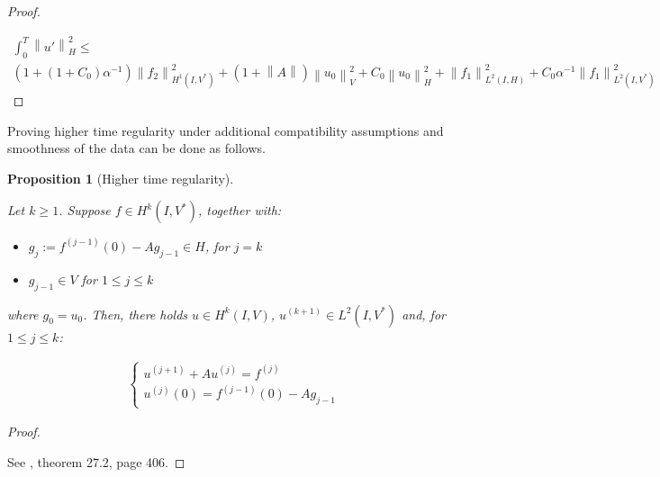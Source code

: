 \documentclass[english,a4paper,10pt,oneside]{scrbook}	%
\theoremstyle{break}
\newtheorem{prop}[equation]{Proposition}
\newenvironment{mproof}[1][\proofname]{%
  \begin{proof}[#1]$ $\par\nobreak\ignorespaces
}{%
  \end{proof}
}
\renewcommand*{\proofname}{Proof}
\theoremstyle{remark}
\newcommand{\norm}[1]{\left\lVert#1\right\rVert}
\newcommand{\HN}[1]{\norm{#1}_{H}}
\newcommand{\VN}[1]{\norm{#1}_{V}}
\newcommand{\emb}{\hookrightarrow}
\begin{document}
\begin{appendices}
\begin{mproof}
%

\begin{align*}
\int_0^T\HN{u'}^2\leq \\
(1+(1+C_0)\alpha^{-1})\norm{f_2}_{H^1(I,V^*)}^2+(1+\norm{A})\VN{u_{0}}^2+C_0\HN{u_0}^2+\norm{f_1}_{L^2(I,H)}^2+C_0\alpha^{-1}\norm{f_1}^2_{L^2(I,V^*)}
\end{align*}
\end{mproof}


Proving higher time regularity under additional compatibility assumptions and smoothness of the data can be done as follows.

\begin{prop}[Higher time regularity]
\label{prop:time_reg}

Let $k\geq 1$. Suppose $f \in H^k(I, V^*)$, together with:

\begin{itemize}
	\item $g_j:=f^{(j-1)}(0)-Ag_{j-1} \in H$, for $j = k$
	\item $g_{j-1} \in V$ for $1\leq j\leq k$
\end{itemize}

where $g_0 = u_0$. Then, there holds $u \in H^k(I,V)$, $u^{(k+1)} \in L^2(I,V^*)$ and, for $1\leq j\leq k$:

\begin{align*}
\left\{\begin{matrix}
u^{(j+1)}+Au^{(j)} = f^{(j)}
\\
u^{(j)}(0) = f^{(j-1)}(0) - Ag_{j-1}
\end{matrix}\right.
\end{align*}



\end{prop}

\begin{mproof}

See \cite{wloka}, theorem 27.2, page 406.
\end{mproof}



\end{appendices}
\end{document}
